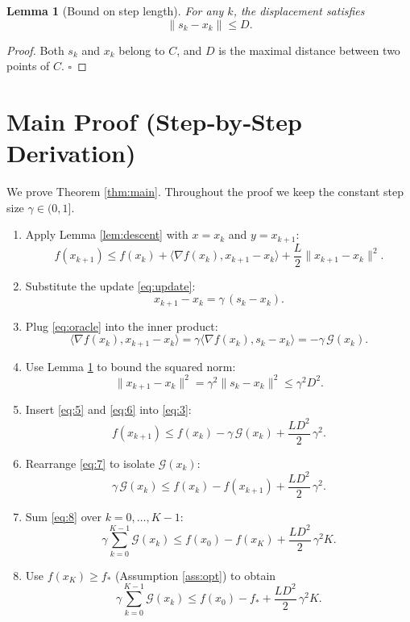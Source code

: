 \documentclass{article}
\newtheorem{lemma}{Lemma}
\newcommand{\gap}{\mathcal{G}}
\newcommand{\diam}{D}
\begin{document}
\begin{lemma}[Bound on step length]\label{lem:diam}
For any $k$, the displacement satisfies
\[
\|s_k-x_k\|\le \diam .
\]
\end{lemma}
\begin{proof}
Both $s_k$ and $x_k$ belong to $C$, and $\diam$ is the maximal distance between two points of $C$. \hfill $\square$
\end{proof}

\section*{Main Proof (Step‑by‑Step Derivation)}
We prove Theorem \ref{thm:main}.  Throughout the proof we keep the constant step size $\gamma\in(0,1]$.

\begin{enumerate}
\item[Step 1.] Apply Lemma \ref{lem:descent} with $x=x_k$ and $y=x_{k+1}$:
\[
f(x_{k+1})\le f(x_k)+\langle\nabla f(x_k),x_{k+1}-x_k\rangle+\frac{L}{2}\|x_{k+1}-x_k\|^2 .
\tag{3}
\]

\item[Step 2.] Substitute the update \eqref{eq:update}:
\[
x_{k+1}-x_k = \gamma\,(s_k-x_k) .
\tag{4}
\]

\item[Step 3.] Plug \eqref{eq:oracle} into the inner product:
\[
\langle\nabla f(x_k),x_{k+1}-x_k\rangle
   = \gamma\langle\nabla f(x_k),s_k-x_k\rangle
   = -\gamma\,\gap(x_k) .
\tag{5}
\]

\item[Step 4.] Use Lemma \ref{lem:diam} to bound the squared norm:
\[
\|x_{k+1}-x_k\|^2 = \gamma^2\|s_k-x_k\|^2 \le \gamma^2\diam^2 .
\tag{6}
\]

\item[Step 5.] Insert \eqref{eq:5} and \eqref{eq:6} into \eqref{eq:3}:
\[
f(x_{k+1})\le f(x_k)-\gamma\,\gap(x_k)+\frac{L\diam^2}{2}\,\gamma^2 .
\tag{7}
\]

\item[Step 6.] Rearrange \eqref{eq:7} to isolate $\gap(x_k)$:
\[
\gamma\,\gap(x_k)\le f(x_k)-f(x_{k+1})+\frac{L\diam^2}{2}\,\gamma^2 .
\tag{8}
\]

\item[Step 7.] Sum \eqref{eq:8} over $k=0,\dots,K-1$:
\[
\gamma\sum_{k=0}^{K-1}\gap(x_k)
   \le f(x_0)-f(x_K)+\frac{L\diam^2}{2}\,\gamma^2 K .
\tag{9}
\]

\item[Step 8.] Use $f(x_K)\ge f_*$ (Assumption \ref{ass:opt}) to obtain
\[
\gamma\sum_{k=0}^{K-1}\gap(x_k)
   \le f(x_0)-f_*+\frac{L\diam^2}{2}\,\gamma^2 K .
\tag{10}
\]


\end{enumerate}
\end{document}
